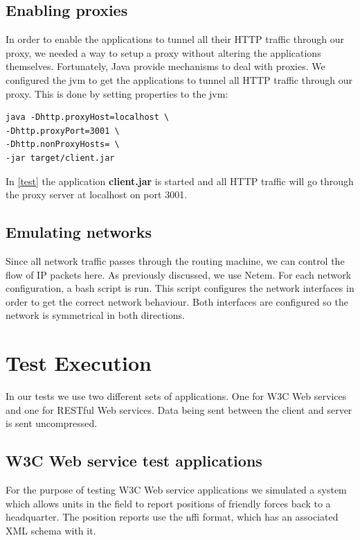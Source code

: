 \subsection{Enabling proxies}

In order to enable the applications to tunnel all their HTTP traffic through our
proxy, we needed a way to setup a proxy without altering the applications
themselves. Fortunately, Java provide mechanisms to deal with
proxies\cite{oracle-proxy}. We configured the \gls{jvm} to get the applications
to tunnel all HTTP traffic through our proxy. This is done by setting properties
to the \gls{jvm}:


\begin{lstlisting}[frame=single, caption="Setting a proxy on the \gls{jvm}", label=test]
java -Dhttp.proxyHost=localhost \
-Dhttp.proxyPort=3001 \
-Dhttp.nonProxyHosts= \
-jar target/client.jar
\end{lstlisting}

In \cref{test} the application \textbf{client.jar} is started and all HTTP
traffic will go through the proxy server at localhost on port 3001.

\subsection{Emulating networks}

Since all network traffic passes through the routing machine, we can control
the flow of IP packets here. As previously discussed, we use Netem.  For each
network configuration, a bash script is run. This script configures the
network interfaces in order to get the correct network behaviour. Both
interfaces are configured so the network is symmetrical in both directions.

\section{Test Execution}

In our tests we use two different sets of applications. One for W3C Web services
and one for RESTful  Web services. Data being sent between the client and server
is sent uncompressed.

\subsection{W3C Web service test applications}

For the purpose of testing W3C Web service applications we simulated a system
which allows units in the field to report positions of friendly forces back to
a headquarter. The position reports use the \gls{nffi} format, which has an
associated XML schema with it.

